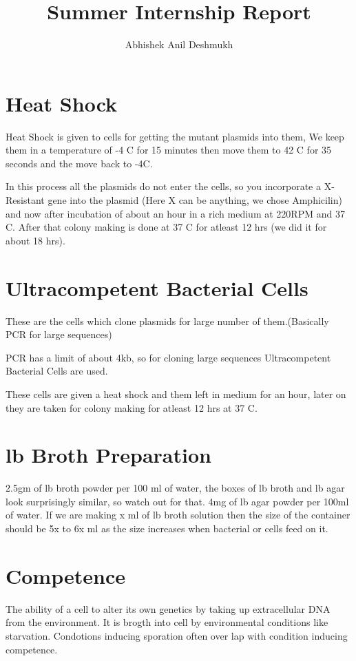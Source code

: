 \documentclass[11pt,twoside,a4paper]{article}
\author{Abhishek Anil Deshmukh}
\title{Summer Internship Report}
\begin{document}
\maketitle

\section{Heat Shock}
Heat Shock  is given to cells for getting the mutant plasmids into them, We keep them in a temperature of -4 \textdegree C for 15 minutes then move them to 42 \textdegree C for 35 seconds and the move back to -4\textdegree C.

In this process all the plasmids do not enter the cells, so you incorporate a X-Resistant gene into the plasmid (Here X can be anything, we chose Amphicilin) and now after incubation of about an hour in a rich medium at 220RPM and 37 \textdegree C. After that colony making is done at 37 \textdegree C for atleast 12 hrs (we did it for about 18 hrs).

\section{Ultracompetent Bacterial Cells}
These are the cells which clone plasmids for large number of them.(Basically PCR for large sequences)

PCR has a limit of about 4kb, so for cloning large sequences Ultracompetent Bacterial Cells are used.

These cells are given a heat shock and them left in medium for an hour, later on they are taken for colony making for atleast 12 hrs at 37 \textdegree C.
\section{lb Broth Preparation}
2.5gm of lb broth powder per 100 ml of water, the boxes of lb broth and lb agar look surprisingly similar, so watch out for that. 4mg of lb agar powder per 100ml of water. If we are making x ml of lb broth solution then the size of the container should be 5x to 6x ml as the size increases when bacterial or cells feed on it.

\section{Competence}
The ability of a cell to alter its own genetics by taking up extracellular DNA from the environment. It is brogth into cell by environmental conditions like starvation. Condotions inducing sporation often over lap with condition inducing competence.
\end{document}
